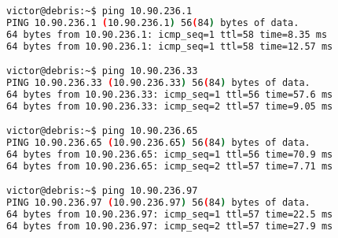 \begin{lstlisting}[language=bash, caption={Connectivity test from a Guifi.net Client to each Mesh client.}]
victor@debris:~$ ping 10.90.236.1
PING 10.90.236.1 (10.90.236.1) 56(84) bytes of data.
64 bytes from 10.90.236.1: icmp_seq=1 ttl=58 time=8.35 ms
64 bytes from 10.90.236.1: icmp_seq=1 ttl=58 time=12.57 ms

victor@debris:~$ ping 10.90.236.33
PING 10.90.236.33 (10.90.236.33) 56(84) bytes of data.
64 bytes from 10.90.236.33: icmp_seq=1 ttl=56 time=57.6 ms
64 bytes from 10.90.236.33: icmp_seq=2 ttl=57 time=9.05 ms

victor@debris:~$ ping 10.90.236.65
PING 10.90.236.65 (10.90.236.65) 56(84) bytes of data.
64 bytes from 10.90.236.65: icmp_seq=1 ttl=56 time=70.9 ms
64 bytes from 10.90.236.65: icmp_seq=2 ttl=57 time=7.71 ms

victor@debris:~$ ping 10.90.236.97
PING 10.90.236.97 (10.90.236.97) 56(84) bytes of data.
64 bytes from 10.90.236.97: icmp_seq=1 ttl=57 time=22.5 ms
64 bytes from 10.90.236.97: icmp_seq=2 ttl=57 time=27.9 ms
\end{lstlisting}
